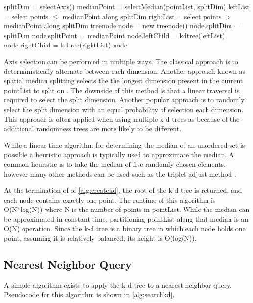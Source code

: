 \begin{algorithmic}
\label{alg:createkd}
	\State splitDim = selectAxis()
	\State
	\State medianPoint = selectMedian(pointList, splitDim)
	\State leftList = select points $\leq$ medianPoint along splitDim
	\State rightList = select points $>$ medianPoint along splitDim
	\State
	\State treenode node = new treenode()
	\State node.splitDim = splitDim
	\State node.splitPoint = medianPoint
	\State node.leftChild = kdtree(leftList)
	\State node.rightChild = kdtree(rightList)
	\State
	\State \Return node
\EndFunction
\end{algorithmic}

Axis selection can be performed in multiple ways.  The classical approach is to deterministically alternate between each dimension.  Another approach known as spatial median splitting selects the the longest dimension present in the current pointList to split on \citep{zhou2008real}.  The downside of this method is that a linear traversal is required to select the split dimension.  Another popular approach is to randomly select the split dimension with an equal probability of selection each dimension.  This approach is often applied when using multiple k-d trees as because of the additional randomness trees are more likely to be different.

While a linear time algorithm for determining the median of an unordered set is possible \cite{megiddo1984linear} a heuristic approach is typically used to approximate the median.  A common heuristic is to take the median of five randomly chosen elements, however many other methods can be used such as the triplet adjust method \cite{battiato2000efficient}.

At the termination of of \ref{alg:createkd}, the root of the k-d tree is returned, and each node contains exactly one point.  The runtime of this algorithm is O(N*log(N)) where N is the number of points in pointList.  While the median can be approximated in constant time, partitioning pointList along that median is an O(N) operation.  Since the k-d tree is a binary tree in which each node holds one point, assuming it is relatively balanced, its height is O(log(N)).

\subsection{Nearest Neighbor Query}

A simple algorithm exists to apply the k-d tree to a nearest neighbor query.  Pseudocode for this algorithm is shown in \ref{alg:searchkd}.

